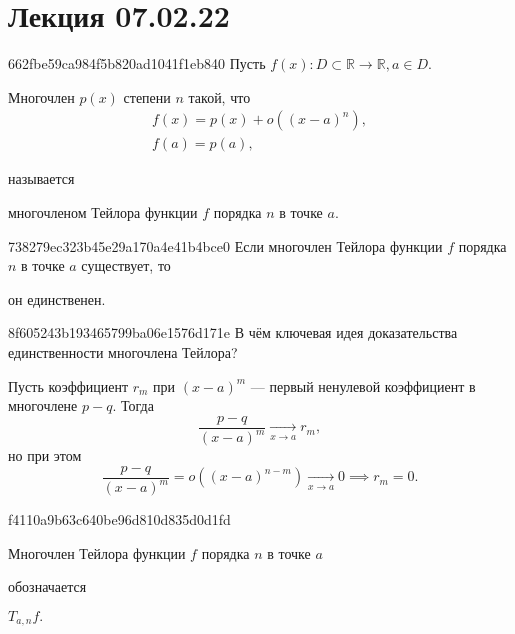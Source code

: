 


\section{Лекция 07.02.22}
\begin{note}{662fbe59ca984f5b820ad1041f1eb840}
    Пусть \( f(x) : D \subset \mathbb R  \to \mathbb R, a \in D. \)
    \begin{icloze}{2}Многочлен \( p(x) \) степени \( n \)  такой, что \[
        \begin{gathered}
            f(x) = p(x) + o((x - a)^{n}), \\
            f(a) = p(a),
        \end{gathered}
    \]\end{icloze}
    называется \begin{icloze}{1}многочленом Тейлора функции \( f \) порядка \( n \) в точке \( a. \)\end{icloze}
\end{note}

\begin{note}{738279ec323b45e29a170a4e41b4bce0}
    Если многочлен Тейлора функции \( f \) порядка \( n \) в точке \( a \) существует, то \begin{icloze}{1}он единственен.\end{icloze}
\end{note}

\begin{note}{8f605243b193465799ba06e1576d171e}
    В чём ключевая идея доказательства единственности многочлена Тейлора?

    \begin{cloze}{1}
        Пусть коэффициент \( r_m  \) при \( (x - a)^{m} \) --- первый ненулевой коэффициент в многочлене \( p - q \).
        Тогда \[
            \frac{p - q}{(x - a)^{m} } \underset{x \to a}\longrightarrow r_m,
        \] но при этом \[
            \frac{p - q}{(x - a)^{m} } = o((x - a)^{n - m}) \underset{x \to a}\longrightarrow 0 \implies r_m = 0.
        \]
    \end{cloze}
\end{note}

\begin{note}{f4110a9b63c640be96d810d835d0d1fd}
    \begin{icloze}{2}Многочлен Тейлора функции \( f \) порядка \( n \) в точке \( a \)\end{icloze} обозначается \begin{icloze}{1}\( T_{a, n} f.  \)\end{icloze}
\end{note}

